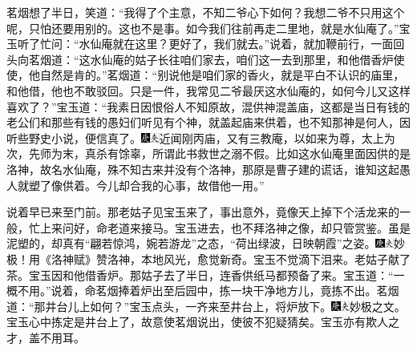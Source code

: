 茗烟想了半日，笑道：``我得了个主意，不知二爷心下如何？我想二爷不只用这个呢，只怕还要用别的。这也不是事。如今我们往前再走二里地，就是水仙庵了。''宝玉听了忙问：``水仙庵就在这里？更好了，我们就去。''说着，就加鞭前行，一面回头向茗烟道：``这水仙庵的姑子长往咱们家去，咱们这一去到那里，和他借香炉使使，他自然是肯的。''茗烟道：``别说他是咱们家的香火，就是平白不认识的庙里，和他借，他也不敢驳回。只是一件，我常见二爷最厌这水仙庵的，如何今儿又这样喜欢了？''宝玉道：``我素日因恨俗人不知原故，混供神混盖庙，这都是当日有钱的老公们和那些有钱的愚妇们听见有个神，就盖起庙来供着，也不知那神是何人，因听些野史小说，便信真了。{\includegraphics[width=3mm]{../Images/00004}\includegraphics[width=3mm]{../Images/00012}\footnotesize \kaishu 近闻刚丙庙，又有三教庵，以如来为尊，太上为次，先师为末，真杀有馀辜，所谓此书救世之溺不假。}比如这水仙庵里面因供的是洛神，故名水仙庵，殊不知古来并没有个洛神，那原是曹子建的谎话，谁知这起愚人就塑了像供着。今儿却合我的心事，故借他一用。''

说着早已来至门前。那老姑子见宝玉来了，事出意外，竟像天上掉下个活龙来的一般，忙上来问好，命老道来接马。宝玉进去，也不拜洛神之像，却只管赏鉴。虽是泥塑的，却真有``翩若惊鸿，婉若游龙''之态，``荷出绿波，日映朝霞''之姿。{\includegraphics[width=3mm]{../Images/00004}\includegraphics[width=3mm]{../Images/00012}\footnotesize \kaishu 妙极！用《洛神赋》赞洛神，本地风光，愈觉新奇。}宝玉不觉滴下泪来。老姑子献了茶。宝玉因和他借香炉。那姑子去了半日，连香供纸马都预备了来。宝玉道：``一概不用。''说着，命茗烟捧着炉出至后园中，拣一块干净地方儿，竟拣不出。茗烟道：``那井台儿上如何？''宝玉点头，一齐来至井台上，将炉放下。{\includegraphics[width=3mm]{../Images/00004}\includegraphics[width=3mm]{../Images/00012}\footnotesize \kaishu 妙极之文。宝玉心中拣定是井台上了，故意使茗烟说出，使彼不犯疑猜矣。宝玉亦有欺人之才，盖不用耳。}

